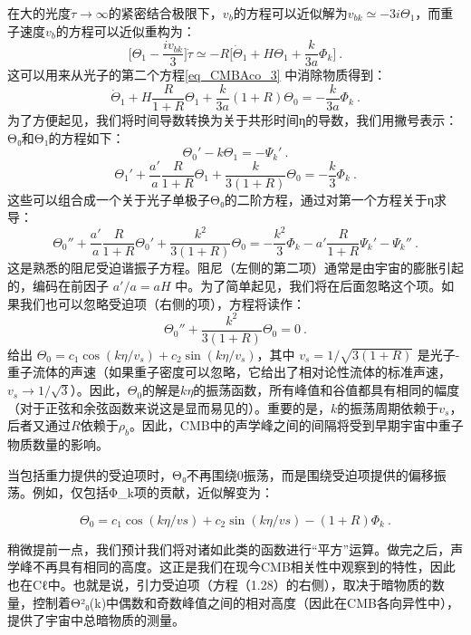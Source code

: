 在大的光度$\dot \tau \rightarrow \infty$的紧密结合极限下，$v_b$的方程可以近似解为$v_{bk} \simeq -3 i\Theta_1$，而重子速度$v_b$的方程可以近似重构为：
\begin{equation}
\bigg[\Theta_1 - \frac{i v_{bk}}{3}\bigg]\dot \tau\simeq -R \bigg[\dot \Theta_1 +H \Theta_1 +\frac{k}{3 a}\Phi_k\bigg]~.
\end{equation}
这可以用来从光子的第二个方程\autoref{eq_CMBAco_3} 中消除物质得到：
\begin{equation}
\dot{\Theta}_1 + H \frac{R}{1 + R} \Theta_1 + \frac{k}{3a} (1 + R) \Theta_0 = -\frac{k}{3a} \Phi_k~. 
\end{equation} 
为了方便起见，我们将时间导数转换为关于共形时间η的导数，我们用撇号表示：Θ₀和Θ₁的方程如下：
\[ \Theta_0' - k \Theta_1 = -\Psi_k'~. \]
\[ \Theta_1' + \frac{a'}{a} \frac{R}{1 + R} \Theta_1 + \frac{k}{3(1 + R)} \Theta_0 = -\frac{k}{3} \Phi_k~. \]
这些可以组合成一个关于光子单极子Θ₀的二阶方程，通过对第一个方程关于η求导：
\begin{equation}
\Theta_0'' + \frac{a'}{a} \frac{R}{1 + R} \Theta_0' + \frac{k^2}{3(1 + R)} \Theta_0 = -\frac{k^2}{3} \Phi_k - a' \frac{R}{1 + R} \Psi_k' - \Psi_k''~. 
\end{equation}
这是熟悉的阻尼受迫谐振子方程。阻尼（左侧的第二项）通常是由宇宙的膨胀引起的，编码在前因子 \( a'/a = aH \) 中。为了简单起见，我们将在后面忽略这个项。如果我们也可以忽略受迫项（右侧的项），方程将读作：
\[ \Theta_0'' + \frac{k^2}{3(1 + R)} \Theta_0 = 0~. \]
给出 \( \Theta_0 = c_1 \cos(k\eta/v_s) + c_2 \sin(k\eta/v_s) \)，其中 \( v_s = 1/\sqrt{3(1 + R)} \) 是光子-重子流体的声速（如果重子密度可以忽略，它给出了相对论性流体的标准声速，\( v_s \rightarrow 1/\sqrt{3} \)）。因此，$\Theta_0$的解是$k\eta$的振荡函数，所有峰值和谷值都具有相同的幅度（对于正弦和余弦函数来说这是显而易见的）。重要的是，$k$的振荡周期依赖于$v_s$，后者又通过$R$依赖于$\rho_b$。因此，CMB中的声学峰之间的间隔将受到早期宇宙中重子物质数量的影响。

当包括重力提供的受迫项时，Θ₀不再围绕0振荡，而是围绕受迫项提供的偏移振荡。例如，仅包括Φ_k项的贡献，近似解变为：

\[ \Theta_0 = c_1 \cos(k\eta/vs) + c_2 \sin(k\eta/vs) - (1 + R) \Phi_k~. \]

稍微提前一点，我们预计我们将对诸如此类的函数进行“平方”运算。做完之后，声学峰不再具有相同的高度。这正是我们在现今CMB相关性中观察到的特性，因此也在Cℓ中。也就是说，引力受迫项（方程（1.28）的右侧），取决于暗物质的数量，控制着Θ²₀(k)中偶数和奇数峰值之间的相对高度（因此在CMB各向异性中），提供了宇宙中总暗物质的测量。

